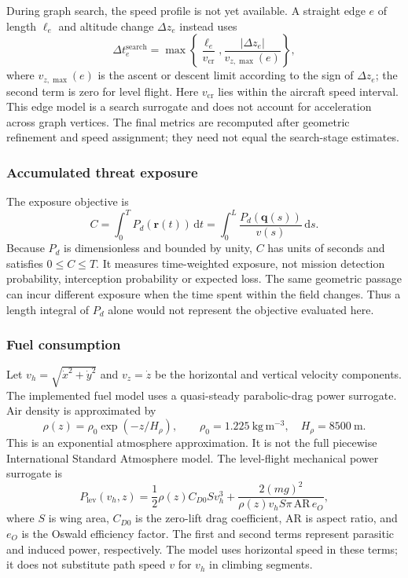During graph search, the speed profile is not yet available. A straight
edge $e$ of length $\ell_e$ and altitude change $\Delta z_e$ instead uses
\begin{equation}
 \Delta t_e^{\mathrm{search}}=
 \max\left\{\frac{\ell_e}{v_{\mathrm{cr}}},
             \frac{|\Delta z_e|}{v_{z,\max}(e)}\right\},
 \label{pr:eq:searchtime}
\end{equation}
where $v_{z,\max}(e)$ is the ascent or descent limit according to the sign
of $\Delta z_e$; the second term is zero for level flight. Here
$v_{\mathrm{cr}}$ lies within the aircraft speed interval. This edge model
is a search surrogate and does not account for acceleration across graph
vertices. The final metrics are recomputed after geometric refinement and
speed assignment; they need not equal the search-stage estimates.

\subsubsection{Accumulated threat exposure}
The exposure objective is
\begin{equation}
 C=\int_0^T P_d(\mathbf{r}(t))\,\mathrm{d}t
   =\int_0^L\frac{P_d(\mathbf{q}(s))}{v(s)}\,\mathrm{d}s.
 \label{pr:eq:exposure}
\end{equation}
Because $P_d$ is dimensionless and bounded by unity, $C$ has units of
seconds and satisfies $0\le C\le T$. It measures time-weighted exposure,
not mission detection probability, interception probability or expected
loss. The same geometric passage can incur different exposure when the
time spent within the field changes. Thus a length integral of $P_d$ alone
would not represent the objective evaluated here.

\subsubsection{Fuel consumption}
Let $v_h=\sqrt{\dot x^2+\dot y^2}$ and $v_z=\dot z$ be the horizontal and
vertical velocity components. The implemented fuel model uses a
quasi-steady parabolic-drag power surrogate. Air density is approximated by
\begin{equation}
 \rho(z)=\rho_0\exp(-z/H_\rho),\qquad
 \rho_0=1.225~\mathrm{kg\,m^{-3}},\quad H_\rho=8500~\mathrm{m}.
 \label{pr:eq:density}
\end{equation}
This is an exponential atmosphere approximation. It is not the full
piecewise International Standard Atmosphere model. The level-flight
mechanical power surrogate is
\begin{equation}
 P_{\mathrm{lev}}(v_h,z)=
 \frac{1}{2}\rho(z)C_{D0}S v_h^3+
 \frac{2(mg)^2}{\rho(z)v_h S\pi\,\mathrm{AR}\,e_O},
 \label{pr:eq:levelpower}
\end{equation}
where $S$ is wing area, $C_{D0}$ is the zero-lift drag coefficient,
$\mathrm{AR}$ is aspect ratio, and $e_O$ is the Oswald efficiency factor.
The first and second terms represent parasitic and induced power,
respectively. The model uses horizontal speed in these terms; it does not
substitute path speed $v$ for $v_h$ in climbing segments.


